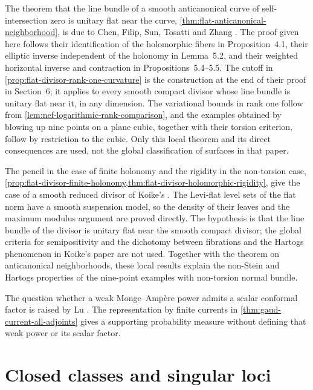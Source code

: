 The theorem that the line bundle of a smooth anticanonical curve of self-intersection zero is unitary flat near the curve, \cref{thm:flat-anticanonical-neighborhood}, is due to Chen, Filip, Sun, Tosatti and Zhang \cite[v1, Theorem~1.1, p.~1, with the standing degree-zero hypothesis in Section~1.1]{CFSTZ26}. The proof given here follows their identification of the holomorphic fibers in Proposition~4.1, their elliptic inverse independent of the holonomy in Lemma~5.2, and their weighted horizontal inverse and contraction in Propositions~5.4--5.5. The cutoff in \cref{prop:flat-divisor-rank-one-curvature} is the construction at the end of their proof in Section~6; it applies to every smooth compact divisor whose line bundle is unitary flat near it, in any dimension. The variational bounds in rank one follow from \cref{lem:nef-logarithmic-rank-comparison}, and the examples obtained by blowing up nine points on a plane cubic, together with their torsion criterion, follow by restriction to the cubic. Only this local theorem and its direct consequences are used, not the global classification of surfaces in that paper.

The pencil in the case of finite holonomy and the rigidity in the non-torsion case, \cref{prop:flat-divisor-finite-holonomy,thm:flat-divisor-holomorphic-rigidity}, give the case of a smooth reduced divisor of Koike's \cite[v2, Lemma~3.5, pp.~15--16]{Koike26}. The Levi-flat level sets of the flat norm have a smooth suspension model, so the density of their leaves and the maximum modulus argument are proved directly. The hypothesis is that the line bundle of the divisor is unitary flat near the smooth compact divisor; the global criteria for semipositivity and the dichotomy between fibrations and the Hartogs phenomenon in Koike's paper are not used. Together with the theorem on anticanonical neighborhoods, these local results explain the non-Stein and Hartogs properties of the nine-point examples with non-torsion normal bundle.

The question whether a weak Monge--Amp\`ere power admits a scalar conformal factor is raised by Lu \cite[Chapter 3, Section 5]{LuHDR22}. The representation by finite currents in \cref{thm:gaud-current-all-adjoints} gives a supporting probability measure without defining that weak power or its scalar factor.

\section{Closed classes and singular loci}
\label{sec:history-closed-loci}

